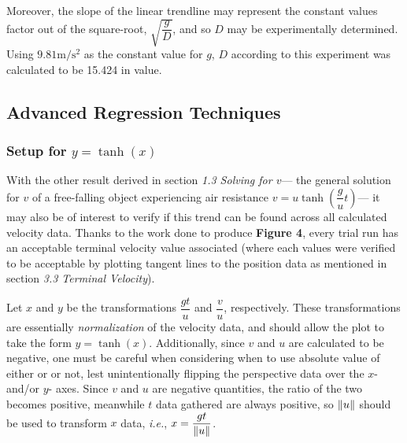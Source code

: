 \documentclass[12pt]{article}
\begin{document}
\begin{multicols}{2}
Moreover, the slope of the linear trendline may represent the constant values factor out of the square-root,
$\sqrt{\dfrac{g}{D}}$, and so $D$ may be experimentally determined. Using $9.81\mathrm{m/s^2}$ as the constant value for $g$,
$D$ according to this experiment was calculated to be 15.424 in value.

\subsection{Advanced Regression Techniques}
\subsubsection{Setup for $y=\tanh(x)$}
With the other result derived in section \textit{1.3 Solving for $v$}---
the general solution for $v$ of a free-falling object experiencing air resistance $v=u\tanh(\dfrac{g}{u}t)$---
it may also be of interest to verify if this trend can be found across all calculated velocity data.
Thanks to the work done to produce \textbf{Figure 4},
every trial run has an acceptable terminal velocity value associated
(where each values were verified to be acceptable by plotting tangent lines to the position data as mentioned in section \textit{3.3 Terminal Velocity}).

Let $x$ and $y$ be the transformations $\dfrac{gt}{u}$ and $\dfrac{v}{u}$, respectively.
These transformations are essentially \textit{normalization} of the velocity data, and should allow the plot to take the form $y=\tanh(x)$.
Additionally, since $v$ and $u$ are calculated to be negative, one must be careful when considering when to use absolute value of either or or not,
lest unintentionally flipping the perspective data over the $x$- and/or $y$- axes.
Since $v$ and $u$ are negative quantities, the ratio of the two becomes positive, meanwhile $t$ data gathered are always positive,
so $\norm{u}$ should be used to transform $x$ data, \textit{i.e.}, $x=\dfrac{gt}{\norm{u}}$.


\end{multicols}
\end{document}

